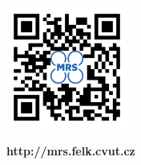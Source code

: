 \documentclass[a4paper,landscape]{article}
\begin{document}
\begin{multicols*}{2}
\begin{minipage}{0.40\textwidth}
\begin{center}
\begin{multicols*}{2}
         \end{multicols*}

         \begin{multicols*}{2}

           \begin{minipage}{0.40\textwidth}
             \begin{left}
               \includegraphics[height=4.0cm]{./fig/qr_mrs_website.png}
             \end{left}
           \end{minipage}

           \begin{minipage}{0.60\textwidth}
             \begin{center}
               \vspace{5.2em}
               \large \textbf{http://mrs.felk.cvut.cz}\\
             \end{center}
           \end{minipage}

         \end{multicols*}

       \end{center}
     \end{minipage}


  \end{multicols*}

  
\end{document}
